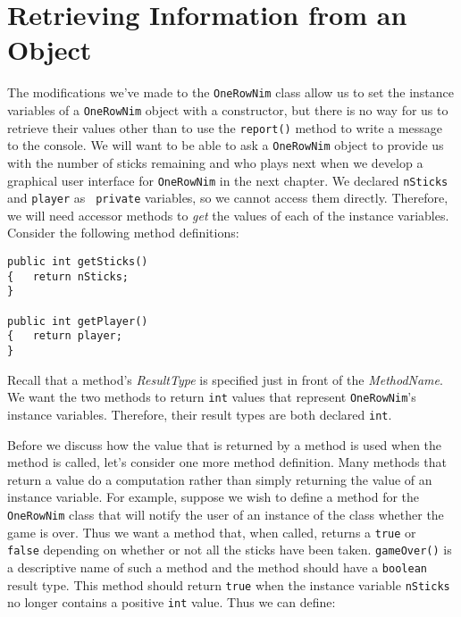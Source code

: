 
\section{Retrieving Information from an Object}

\noindent The modifications we've made to the {\tt OneRowNim} class
allow us to set the instance variables of a {\tt OneRowNim} object
with a constructor, but there is no way for us to retrieve their
values other than to use the {\tt report()} method to write a message
to the console. We will want to be able to ask a {\tt OneRowNim}
object to provide us with the number of sticks remaining and who plays
next when we develop a graphical user interface for {\tt OneRowNim} in
the next chapter.  We declared {\tt nSticks} and {\tt player} as {\tt
private} variables, so we cannot access them directly.  Therefore, we
will need accessor methods to {\it get} the values of each of the
instance variables.  Consider the following method definitions:

\begin{jjjlisting}
\begin{lstlisting}
public int getSticks()
{   return nSticks;
}

public int getPlayer()
{   return player;
}
\end{lstlisting}
\end{jjjlisting}

\noindent Recall that a method's {\it ResultType} is specified just
in front of the {\it MethodName}. We want the two methods to return
{\tt int} values that represent {\tt OneRowNim}'s instance
variables. Therefore, their result types are both declared {\tt int}.

Before we discuss how the value that is returned by a method is used
when the method is called, let's consider one more method definition.
Many methods that return a value do a computation rather than simply
returning the value of an instance variable.  For example, suppose we
wish to define a method for the {\tt OneRowNim} class that will notify
the user of an instance of the class whether the game is over.  Thus
we want a method that, when called, returns a {\tt true} or {\tt
false} depending on whether or not all the sticks have been taken.
{\tt gameOver()} is a descriptive name of such a method and the method
should have a {\tt boolean} result type.  This method should return
{\tt true} when the instance variable {\tt nSticks} no longer contains
a positive {\tt int} value.  Thus we can define:

